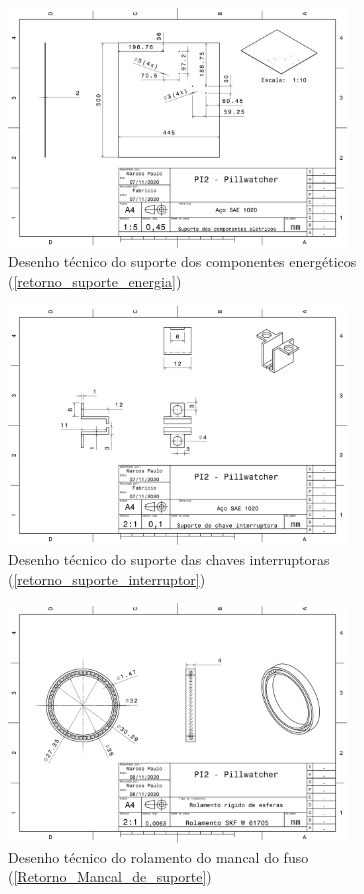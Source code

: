\begin{apendicesenv}
\begin{figure}[H]
    \centering
    \includegraphics[width=0.8\textwidth]{figuras/estrutura/Desenhos/Suporte_Energia.pdf}
    \caption{Desenho técnico do suporte dos componentes energéticos (\ref{retorno_suporte_energia})}
    \label{fig:suporte_energia}
\end{figure}

\begin{figure}[H]
    \centering
    \includegraphics[width=0.8\textwidth]{figuras/estrutura/Desenhos/Suporte_interruptor.pdf}
    \caption{Desenho técnico do suporte das chaves interruptoras (\ref{retorno_suporte_interruptor})}
    \label{fig:suporte_interruptor}
\end{figure}

\begin{figure}[H]
    \centering
    \includegraphics[width=0.8\textwidth]{figuras/estrutura/Desenhos/Rolamento_fuso.pdf}
    \caption{Desenho técnico do rolamento do mancal do fuso (\ref{Retorno_Mancal_de_suporte})}
    \label{fig:rolamento_fuso}
\end{figure}



\end{apendicesenv}
